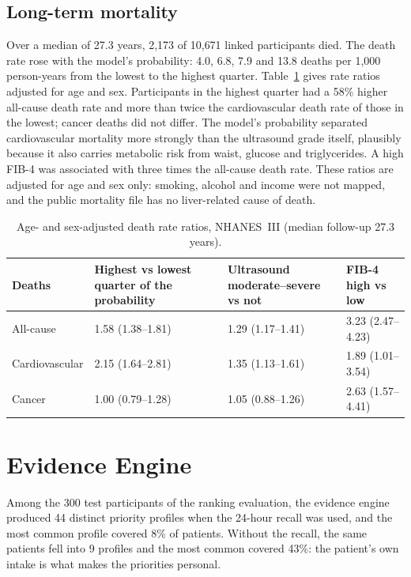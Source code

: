 \subsection{Long-term mortality}

Over a median of 27.3 years, 2{,}173 of 10{,}671 linked participants died. The
death rate rose with the model's probability: 4.0, 6.8, 7.9 and 13.8 deaths
per 1{,}000 person-years from the lowest to the highest quarter.
Table~\ref{tab:r_mortality} gives rate ratios adjusted for age and sex.
Participants in the highest quarter had a 58\% higher all-cause death rate and
more than twice the cardiovascular death rate of those in the lowest; cancer
deaths did not differ. The model's probability separated cardiovascular
mortality more strongly than the ultrasound grade itself, plausibly because it
also carries metabolic risk from waist, glucose and triglycerides. A high FIB-4
was associated with three times the all-cause death rate. These ratios are
adjusted for age and sex only: smoking, alcohol and income were not mapped,
and the public mortality file has no liver-related cause of death.

\begin{table}[htbp]
\centering
\caption{Age- and sex-adjusted death rate ratios, NHANES~III (median follow-up 27.3 years).}
\label{tab:r_mortality}
\begin{tabular}{p{2.6cm}p{3.6cm}p{3.6cm}p{3.6cm}}
\toprule
Deaths & Highest vs lowest quarter of the probability & Ultrasound moderate--severe vs not & FIB-4 high vs low \\
\midrule
All-cause & 1.58 (1.38--1.81) & 1.29 (1.17--1.41) & 3.23 (2.47--4.23) \\
Cardiovascular & 2.15 (1.64--2.81) & 1.35 (1.13--1.61) & 1.89 (1.01--3.54) \\
Cancer & 1.00 (0.79--1.28) & 1.05 (0.88--1.26) & 2.63 (1.57--4.41) \\
\bottomrule
\end{tabular}
\end{table}

\section{Evidence Engine}
\label{sec:r_priorities}

Among the 300 test participants of the ranking evaluation, the evidence engine
produced 44 distinct priority profiles when the 24-hour recall was used, and
the most common profile covered 8\% of patients. Without the recall, the same
patients fell into 9 profiles and the most common covered 43\%: the patient's
own intake is what makes the priorities personal.

